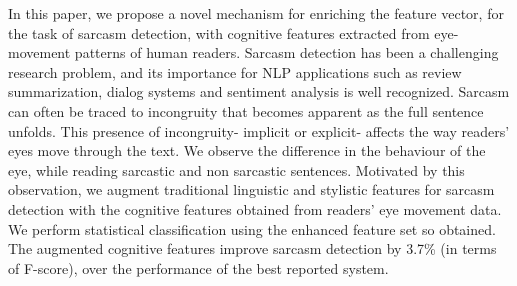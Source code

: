 In this paper, we propose a novel mechanism for enriching the feature vector, for the task of sarcasm detection, with cognitive features extracted from eye-movement patterns of human readers. Sarcasm detection has been a challenging research problem, and its importance for NLP applications such as review summarization, dialog systems and sentiment analysis is well recognized. Sarcasm can often be traced to incongruity that becomes apparent as the full sentence unfolds. This presence of incongruity- implicit or explicit- affects the way readers' eyes move through the text. We observe the difference in the behaviour of the eye, while reading sarcastic and non sarcastic sentences. Motivated by this observation, we augment traditional linguistic and stylistic features for sarcasm detection with the cognitive features obtained from readers' eye movement data. We perform statistical classification using the enhanced feature set so obtained. The augmented cognitive features improve sarcasm detection by 3.7\% (in terms of F-score), over the performance of the best reported system.

